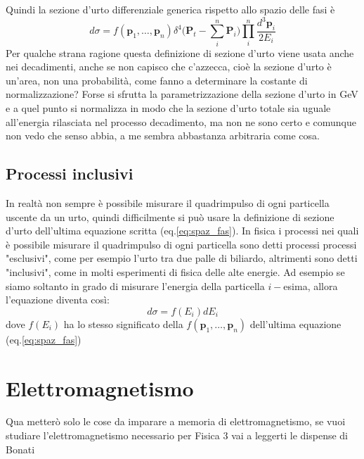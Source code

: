 \documentclass[11pt,a4paper]{report}
\newcommand{\vettore}[1]{\mathbf{#1}}
\begin{document}
		Quindi la sezione d'urto differenziale generica rispetto allo spazio delle fasi è
		\begin{equation}
			d\sigma=f(\vettore p_1,\dots,\vettore p_n)\delta^4\bigg(\vettore P_t-\sum_i^n \vettore P_i\bigg)\prod_i^n\frac{d^3\vettore p_i}{2E_i}
			\label{eq:spaz_fas}
		\end{equation} 
		Per qualche strana ragione questa definizione di sezione d'urto viene usata anche nei decadimenti, anche se non capisco che c'azzecca, cioè la sezione d'urto è un'area, non una probabilità, come fanno a determinare la costante di normalizzazione?\newline
		Forse si sfrutta la parametrizzazione della sezione d'urto in GeV e a quel punto si normalizza in modo che la sezione d'urto totale sia uguale all'energia rilasciata nel processo decadimento, ma non ne sono certo e comunque non vedo che senso abbia, a me sembra abbastanza arbitraria come cosa.


	\section{Processi inclusivi}
		In realtà non sempre è possibile misurare il quadrimpulso di ogni particella uscente da un urto, quindi difficilmente si può usare la definizione di sezione d'urto dell'ultima equazione scritta (eq.\ref{eq:spaz_fas}).\newline
		In fisica i processi nei quali è possibile misurare il quadrimpulso di ogni particella sono detti processi processi "esclusivi", come per esempio l'urto tra due palle di biliardo, altrimenti sono detti "inclusivi", come in molti esperimenti di fisica delle alte energie.\newline
		Ad esempio se siamo soltanto in grado di misurare l'energia della particella $i-$esima, allora l'equazione diventa così:
		\begin{equation}
			d\sigma=f(E_i)dE_i
		\end{equation}
		dove $f(E_i)$ ha lo stesso significato della $f(\vettore p_1,\dots,\vettore p_n)$ dell'ultima equazione (eq.\ref{eq:spaz_fas})


















\chapter{Elettromagnetismo}
	Qua metterò solo le cose da imparare a memoria di elettromagnetismo, se vuoi studiare l'elettromagnetismo necessario per Fisica 3 vai a leggerti le dispense di Bonati
\end{document}
